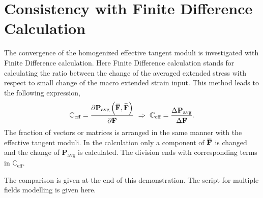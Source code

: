 \documentclass[10pt,a4paper]{scrreprt}
\newcommand{\overbar}[1]{\mkern 1.5mu\overline{\mkern-1.5mu#1\mkern-1.5mu}\mkern 1.5mu}
\begin{document}
\section{Consistency with Finite Difference Calculation}
The convergence of the homogenized effective tangent moduli is investigated with Finite Difference calculation. Here Finite Difference calculation stands for calculating the ratio between the change of the averaged extended stress with respect to small change of the macro extended strain input. This method leads to the following expression, 
\begin{equation}
\mathbb{C}_{\text{eff}} = \dfrac{\partial \mathbf{P}_{\text{avg}} \left( \overbar{\mathbf{F}}, \widetilde{\mathbf{F}} \right)}{\partial \overbar{\mathbf{F}}} \ \Rightarrow \ \mathbb{C}_{\text{eff}} = \dfrac{\Delta \mathbf{P}_{\text{avg}}}{\Delta \overbar{\mathbf{F}}}.
\end{equation}
The fraction of vectors or matrices is arranged in the same manner with the effective tangent moduli. In the calculation only a component of $\overbar{\mathbf{F}}$ is changed and the change of $\mathbf{P}_{\text{avg}}$ is calculated. The division ends with corresponding terms in $\mathbb{C}_{\text{eff}}$.

The comparison is given at the end of this demonstration. The script for multiple fields modelling is given here.
\end{document}
